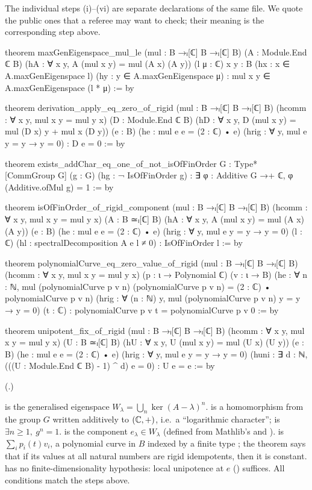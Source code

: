 The individual steps (i)--(vi) are separate declarations of the same file.  We quote the public ones that a referee
may want to check; their meaning is the corresponding step above.
\begin{leancode}
theorem maxGenEigenspace_mul_le (mul : B →ₗ[ℂ] B →ₗ[ℂ] B)
    (A : Module.End ℂ B) (hA : ∀ x y, A (mul x y) = mul (A x) (A y))
    (l μ : ℂ) {x y : B}
    (hx : x ∈ A.maxGenEigenspace l) (hy : y ∈ A.maxGenEigenspace μ) :
    mul x y ∈ A.maxGenEigenspace (l * μ) := by

theorem derivation_apply_eq_zero_of_rigid (mul : B →ₗ[ℂ] B →ₗ[ℂ] B)
    (hcomm : ∀ x y, mul x y = mul y x) (D : Module.End ℂ B)
    (hD : ∀ x y, D (mul x y) = mul (D x) y + mul x (D y))
    (e : B) (he : mul e e = (2 : ℂ) • e)
    (hrig : ∀ y, mul e y = y → y = 0) : D e = 0 := by

theorem exists_addChar_eq_one_of_not_isOfFinOrder {G : Type*} [CommGroup G]
    (g : G) (hg : ¬ IsOfFinOrder g) :
    ∃ φ : Additive G →+ ℂ, φ (Additive.ofMul g) = 1 := by

theorem isOfFinOrder_of_rigid_component (mul : B →ₗ[ℂ] B →ₗ[ℂ] B)
    (hcomm : ∀ x y, mul x y = mul y x)
    (A : B ≃ₗ[ℂ] B) (hA : ∀ x y, A (mul x y) = mul (A x) (A y))
    (e : B) (he : mul e e = (2 : ℂ) • e)
    (hrig : ∀ y, mul e y = y → y = 0)
    (l : ℂ) (hl : spectralDecomposition A e l ≠ 0) : IsOfFinOrder l := by

theorem polynomialCurve_eq_zero_value_of_rigid (mul : B →ₗ[ℂ] B →ₗ[ℂ] B)
    (hcomm : ∀ x y, mul x y = mul y x) (p : ι → Polynomial ℂ) (v : ι → B)
    (he : ∀ n : ℕ, mul (polynomialCurve p v n) (polynomialCurve p v n) =
      (2 : ℂ) • polynomialCurve p v n)
    (hrig : ∀ (n : ℕ) y, mul (polynomialCurve p v n) y = y → y = 0)
    (t : ℂ) : polynomialCurve p v t = polynomialCurve p v 0 := by

theorem unipotent_fix_of_rigid (mul : B →ₗ[ℂ] B →ₗ[ℂ] B)
    (hcomm : ∀ x y, mul x y = mul y x)
    (U : B ≃ₗ[ℂ] B) (hU : ∀ x y, U (mul x y) = mul (U x) (U y))
    (e : B) (he : mul e e = (2 : ℂ) • e)
    (hrig : ∀ y, mul e y = y → y = 0)
    (huni : ∃ d : ℕ, (((U : Module.End ℂ B) - 1) ^ d) e = 0) : U e = e := by
\end{leancode}
(.)
\begin{dictionary}
 is the generalised eigenspace $W_\lambda=\bigcup_n\ker(A-\lambda)^n$.
 is a homomorphism from the group $G$ written additively to $({\mathbb{C}},+)$, i.e.\ a ``logarithmic
character'';  is $\exists n\ge1,\ g^n=1$.   is the component
$e_\lambda\in W_\lambda$ (defined from Mathlib's  and
).   is $\sum_ip_i(t)v_i$, a polynomial curve in $B$
indexed by a finite type ; the theorem says that if its values at all natural numbers are rigid idempotents,
then it is constant.   has no finite-dimensionality hypothesis: local unipotence at $e$
() suffices.  All conditions match the steps above.
\end{dictionary}
